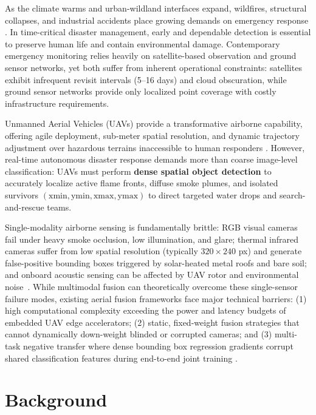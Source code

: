 As the climate warms and urban-wildland interfaces expand, wildfires, structural collapses, and industrial accidents place growing demands on emergency response \cite{erdelj2017help}. In time-critical disaster management, early and dependable detection is essential to preserve human life and contain environmental damage. Contemporary emergency monitoring relies heavily on satellite-based observation and ground sensor networks, yet both suffer from inherent operational constraints: satellites exhibit infrequent revisit intervals (5--16 days) and cloud obscuration, while ground sensor networks provide only localized point coverage with costly infrastructure requirements.

Unmanned Aerial Vehicles (UAVs) provide a transformative airborne capability, offering agile deployment, sub-meter spatial resolution, and dynamic trajectory adjustment over hazardous terrains inaccessible to human responders \cite{merino2012unmanned}. However, real-time autonomous disaster response demands more than coarse image-level classification: UAVs must perform \textbf{dense spatial object detection} to accurately localize active flame fronts, diffuse smoke plumes, and isolated survivors $(\text{xmin}, \text{ymin}, \text{xmax}, \text{ymax})$ to direct targeted water drops and search-and-rescue teams.

Single-modality airborne sensing is fundamentally brittle: RGB visual cameras fail under heavy smoke occlusion, low illumination, and glare; thermal infrared cameras suffer from low spatial resolution (typically $320\times240$ px) and generate false-positive bounding boxes triggered by solar-heated metal roofs and bare soil; and onboard acoustic sensing can be affected by UAV rotor and environmental noise~\cite{gupta2025droneaudioset}. While multimodal fusion can theoretically overcome these single-sensor failure modes, existing aerial fusion frameworks face major technical barriers: (1) high computational complexity exceeding the power and latency budgets of embedded UAV edge accelerators; (2) static, fixed-weight fusion strategies that cannot dynamically down-weight blinded or corrupted cameras; and (3) multi-task negative transfer where dense bounding box regression gradients corrupt shared classification features during end-to-end joint training \cite{baltrusaitis2019multimodal, yu2020gradient}.

\section{Background}

